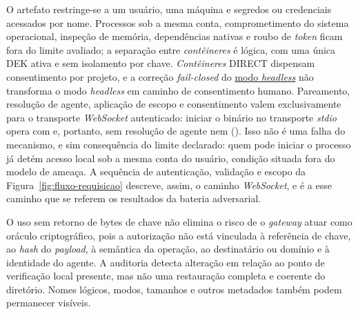 \documentclass[12pt,openright,twoside,a4paper,english,brazil]{abntex2}
\begin{document}
O artefato restringe-se a um usuário, uma máquina e segredos ou credenciais acessados por nome. Processos sob a mesma conta, comprometimento do sistema operacional, inspeção de memória, dependências nativas e roubo de \textit{token} ficam fora do limite avaliado; a separação entre \textit{contêineres} é lógica, com uma única DEK ativa e sem isolamento por chave. \textit{Contêineres} DIRECT dispensam consentimento por projeto, e a correção \textit{fail-closed} do \hyperref[nota:headless]{modo \textit{headless}} não transforma o modo \textit{headless} em caminho de consentimento humano. Pareamento, resolução de agente, aplicação de escopo e consentimento valem exclusivamente para o transporte \textit{WebSocket} autenticado: iniciar o binário no transporte \textit{stdio} opera com  e, portanto, sem resolução de agente nem  (). Isso não é uma falha do mecanismo, e sim consequência do limite declarado: quem pode iniciar o processo já detém acesso local sob a mesma conta do usuário, condição situada fora do modelo de ameaça. A sequência de autenticação, validação e escopo da Figura~\ref{fig:fluxo-requisicao} descreve, assim, o caminho \textit{WebSocket}, e é a esse caminho que se referem os resultados da bateria adversarial.

O uso sem retorno de bytes de chave não elimina o risco de o \textit{gateway} atuar como oráculo criptográfico, pois a autorização não está vinculada à referência de chave, ao \textit{hash} do \textit{payload}, à semântica da operação, ao destinatário ou domínio e à identidade do agente. A auditoria detecta alteração em relação ao ponto de verificação local presente, mas não uma restauração completa e coerente do diretório. Nomes lógicos, modos, tamanhos e outros metadados também podem permanecer visíveis.
\end{document}
